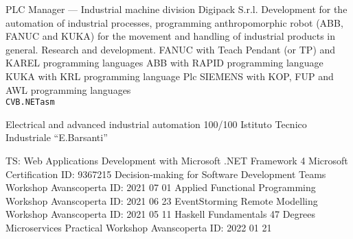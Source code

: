 \documentclass[9pt]{developercv}
\begin{document}
\begin{entrylist}
		{PLC Manager --- Industrial machine division}
		{Digipack S.r.l.}
		{Development for the automation of industrial processes, programming anthropomorphic robot (ABB, FANUC and KUKA) for the movement and handling of industrial products in general. Research and development. FANUC with Teach Pendant (or TP) and KAREL programming languages ABB with RAPID programming language KUKA with KRL programming language Plc SIEMENS with KOP, FUP and AWL programming languages \\
	   \texttt{C}\slashsep\texttt{VB.NET}\slashsep\texttt{asm}}

\end{entrylist}



\begin{entrylist}
		{Electrical and advanced industrial automation 100/100}
		{Istituto Tecnico Industriale “E.Barsanti”}
		{}
\end{entrylist}



\begin{entrylist}
		{TS\@: Web Applications Development with Microsoft \@.NET Framework 4}
		{Microsoft Certification}
		{ID\@: 9367215}
		{Decision-making for Software Development Teams Workshop}
		{Avanscoperta}
		{ID\@: 2021 07 01}
		{Applied Functional Programming Workshop}
		{Avanscoperta}
		{ID\@: 2021 06 23}
		{EventStorming Remote Modelling Workshop}
		{Avanscoperta}
		{ID\@: 2021 05 11}
		{Haskell Fundamentals }
		{47 Degrees}
		{}
		{Microservices Practical Workshop}
		{Avanscoperta}
		{ID\@: 2022 01 21}
\end{entrylist}
\end{document}
